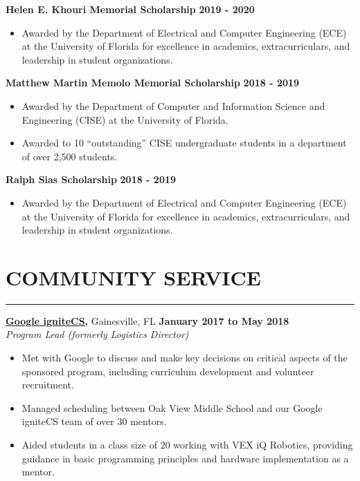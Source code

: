 \documentclass[11pt]{article} %
\begin{document}
	\noindent\textbf{Helen E. Khouri Memorial Scholarship} \hfill\textbf{2019 - 2020}
	\begin{itemize}[noitemsep,nolistsep, label={-}]
		\item Awarded by the Department of Electrical and Computer Engineering (ECE) at the University of Florida for excellence in academics, extracurriculars, and leadership in student organizations.
	\end{itemize}
	\vspace{.20cm}
	
	\noindent\textbf{Matthew Martin Memolo Memorial Scholarship} \hfill\textbf{2018 - 2019}
	\begin{itemize}[noitemsep,nolistsep, label={-}]
		\item Awarded by the Department of Computer and Information Science and Engineering (CISE) at the University of Florida.
		\item Awarded to 10 ``outstanding'' CISE undergraduate students in a department of over 2,500 students.
	\end{itemize}
	\vspace{.20cm}

	\noindent\textbf{Ralph Sias Scholarship} \hfill\textbf{2018 - 2019}
	\begin{itemize}[noitemsep,nolistsep, label={-}]
		\item Awarded by the Department of Electrical and Computer Engineering (ECE) at the University of Florida for excellence in academics, extracurriculars, and leadership in student organizations.
	\end{itemize}
	\pagebreak
	
	\section*{COMMUNITY SERVICE}
	\hrule \relax
	\vspace{.4cm}

	\noindent \href{https://sites.google.com/view/ignitecs/home}{\textbf{Google igniteCS,}} Gainesville, FL \hfill\textbf{January 2017 to May 2018}\\
	\textit{Program Lead (formerly Logistics Director)}
	\begin{itemize}[noitemsep,nolistsep, label = {-}]
		\item Met with Google to discuss and make key decisions on critical aspects of the sponsored program, including curriculum development and volunteer recruitment.
		\item Managed scheduling between Oak View Middle School and our Google igniteCS team of over 30 mentors.
		\item Aided students in a class size of 20 working with VEX iQ Robotics, providing guidance in basic programming principles and hardware implementation as a mentor.
	\end{itemize} 
	\vspace{.20cm}
	
\end{document}
